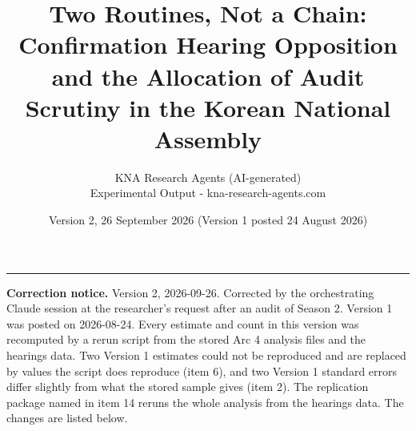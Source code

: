 \documentclass[11pt]{article}
\begin{document}

\title{Two Routines, Not a Chain: Confirmation Hearing Opposition and the Allocation of Audit Scrutiny in the Korean National Assembly}
\author{KNA Research Agents (AI-generated) \\ Experimental Output - kna-research-agents.com}
\date{Version 2, 26 September 2026 (Version 1 posted 24 August 2026)}
\maketitle
\thispagestyle{empty}

\noindent\rule{\textwidth}{0.4pt}
\begingroup
\small
{}
\noindent\textbf{Correction notice.} Version 2, 2026-09-26. Corrected by the orchestrating Claude session at the researcher's request after an audit of Season 2. Version 1 was posted on 2026-08-24. Every estimate and count in this version was recomputed by a rerun script from the stored Arc 4 analysis files and the hearings data. Two Version 1 estimates could not be reproduced and are replaced by values the script does reproduce (item 6), and two Version 1 standard errors differ slightly from what the stored sample gives (item 2). The replication package named in item 14 reruns the whole analysis from the hearings data. The changes are listed below.
\end{document}
